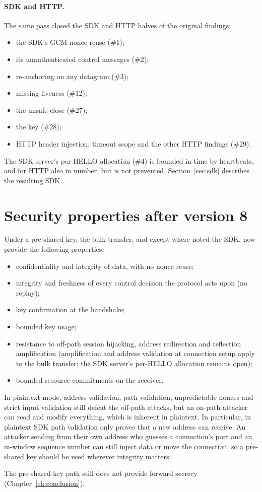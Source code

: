 \paragraph{SDK and HTTP.} The same pass closed the SDK and HTTP halves of the original findings:
\begin{itemize}
  \item the SDK's GCM nonce reuse (\#1);
  \item its unauthenticated control messages (\#2);
  \item re-anchoring on any datagram (\#3);
  \item missing liveness (\#12);
  \item the unsafe close (\#27);
  \item the  key (\#28);
  \item HTTP header injection, timeout scope and the other HTTP findings (\#29).
\end{itemize}
The SDK server's per-HELLO allocation (\#4) is bounded in time by heartbeats, and for HTTP also in number, but
is not prevented. Section~\ref{sec:sdk} describes the resulting SDK.

\section{Security properties after version 8}

Under a pre-shared key, the bulk transfer, and except where noted the SDK, now provide the following
properties:
\begin{itemize}
  \item confidentiality and integrity of data, with no nonce reuse;
  \item integrity and freshness of every control decision the protocol acts upon (no replay);
  \item key confirmation at the handshake;
  \item bounded key usage;
  \item resistance to off-path session hijacking, address redirection and reflection amplification
    (amplification and address validation at connection setup apply to the bulk transfer; the SDK server's
    per-HELLO allocation remains open);
  \item bounded resource commitments on the receiver.
\end{itemize}

In plaintext mode, address validation, path validation, unpredictable nonces and strict input validation still
defeat the off-path attacks, but an on-path attacker can read and modify everything, which is inherent in
plaintext. In particular, in plaintext SDK path validation only proves that a new address can receive. An
attacker sending from their own address who guesses a connection's port and an in-window sequence number can
still inject data or move the connection, so a pre-shared key should be used wherever integrity matters.

The pre-shared-key path still does not provide forward secrecy (Chapter~\ref{ch:conclusion}).
